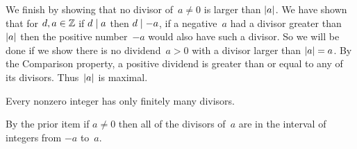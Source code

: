 \documentclass{ibl}  %
\begin{document}
\begin{problem}
\begin{exes}
\begin{answer}
  We finish by showing that no divisor of~$a\neq 0$ is larger than $\lvert a\rvert$.
  We have shown that for $d,a\in\mathbb{Z}$ if $d\mid a$ then $d\mid -a$,
  if a negative~$a$ had a divisor greater than~$\lvert a\rvert$ then the
  positive number~$-a$ would also have such a divisor.
  So we will be done if
  we show there is no dividend~$a>0$ with a divisor larger than $\lvert a\rvert=a$.
  By the Comparison property, a positive dividend is greater than or 
  equal to any of its divisors. 
  Thus~$\lvert a\rvert$ is maximal.
\end{answer}
\begin{exercise}
  Every nonzero integer has only finitely many divisors.
\end{exercise}
\begin{answer}
  By the prior item if $a\neq 0$ then all of the divisors of~$a$
  are in the interval of integers from $-a$ to~$a$. 
\end{answer}

\end{exes}
\end{problem}
\end{document}
